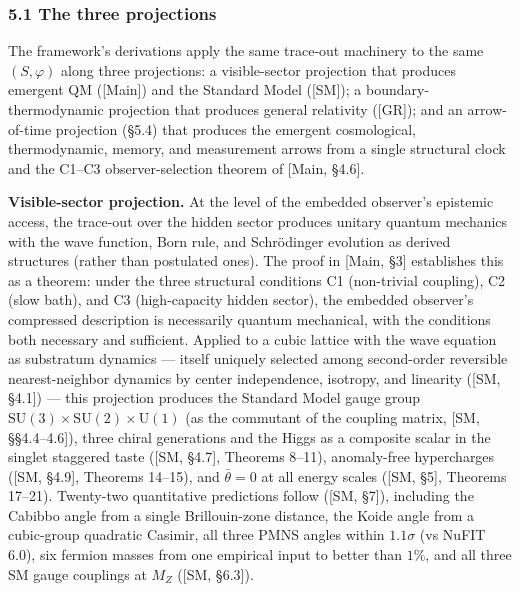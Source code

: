 \documentclass[
]{article}
\begin{document}
\hypertarget{the-three-projections}{%
\subsubsection{5.1 The three projections}\label{the-three-projections}}

The framework's derivations apply the same trace-out machinery to the
same \((S, \varphi)\) along three projections: a visible-sector
projection that produces emergent QM ({[}Main{]}) and the Standard Model
({[}SM{]}); a boundary-thermodynamic projection that produces general
relativity ({[}GR{]}); and an arrow-of-time projection (§5.4) that
produces the emergent cosmological, thermodynamic, memory, and
measurement arrows from a single structural clock and the C1--C3
observer-selection theorem of {[}Main, §4.6{]}.

\textbf{Visible-sector projection.} At the level of the embedded
observer's epistemic access, the trace-out over the hidden sector
produces unitary quantum mechanics with the wave function, Born rule,
and Schrödinger evolution as derived structures (rather than postulated
ones). The proof in {[}Main, §3{]} establishes this as a theorem: under
the three structural conditions C1 (non-trivial coupling), C2 (slow
bath), and C3 (high-capacity hidden sector), the embedded observer's
compressed description is necessarily quantum mechanical, with the
conditions both necessary and sufficient. Applied to a cubic lattice
with the wave equation as substratum dynamics --- itself uniquely
selected among second-order reversible nearest-neighbor dynamics by
center independence, isotropy, and linearity ({[}SM, §4.1{]}) --- this
projection produces the Standard Model gauge group
\(\mathrm{SU}(3) \times \mathrm{SU}(2) \times \mathrm{U}(1)\) (as the
commutant of the coupling matrix, {[}SM, §§4.4--4.6{]}), three chiral
generations and the Higgs as a composite scalar in the singlet staggered
taste ({[}SM, §4.7{]}, Theorems 8--11), anomaly-free hypercharges
({[}SM, §4.9{]}, Theorems 14--15), and \(\bar\theta = 0\) at all energy
scales ({[}SM, §5{]}, Theorems 17--21). Twenty-two quantitative
predictions follow ({[}SM, §7{]}), including the Cabibbo angle from a
single Brillouin-zone distance, the Koide angle from a cubic-group
quadratic Casimir, all three PMNS angles within \(1.1\sigma\) (vs NuFIT
6.0), six fermion masses from one empirical input to better than
\(1\%\), and all three SM gauge couplings at \(M_Z\) ({[}SM, §6.3{]}).
\end{document}
